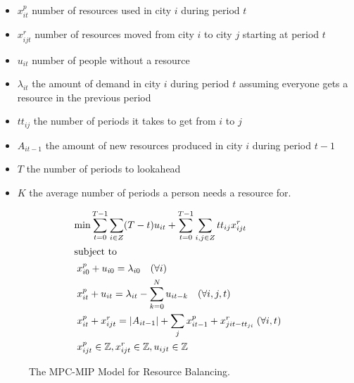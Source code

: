 \documentclass{article}
\begin{document}
\begin{itemize}
	\item $x^p_{it}$ number of resources used in city $i$ during period $t$
	\item $x^r_{ijt}$ number of resources moved from city $i$ to city $j$ starting at period $t$
	\item $u_{it}$ number of people without a resource
	\item $\lambda_{it}$ the amount of demand in city $i$ during period $t$ assuming everyone gets a resource in the previous period
	\item $tt_{ij}$ the number of periods it takes to get from $i$ to $j$
	\item $A_{it-1}$ the amount of new resources produced in city $i$ during period $t-1$
	\item $T$ the number of periods to lookahead
	\item $K$ the average number of periods a person needs a resource for.
\end{itemize}

\begin{figure}[!t]
\begin{subequations} \label{mpc}
\begin{flalign}
& \text{min} \sum_{t=0}^{T-1}\sum_{i \in Z} (T - t)u_{it}  + \sum_{t=0}^{T-1} \sum_{i,j \in Z} tt_{ij} x^r_{ijt} \label{mpc:obj} \\
\intertext{subject to} 
& \; x^p_{i0}  + u_{i0} = \lambda_{i0} \quad (\forall i) \label{mpc:constr:demand_balance_0} \\	
& \; x^p_{it}  + u_{it} = \lambda_{it} - \sum_{k=0}^N u_{it-k} \quad (\forall i,j,t) \label{mpc:constr:demand_balance} \\ 
& \; x^p_{it} + x^r_{ijt} = |A_{it-1}| + \sum_{j} x^p_{i t-1} + x^r_{jit - tt_{ji}} \; (\forall i,t)  \label{mpc:constr:balance} \\
& \; x^p_{ijt} \in \mathbb{Z}, x^r_{ijt} \in \mathbb{Z}, u_{ijt} \in \mathbb{Z}  \label{mpc:constr:domain}
\end{flalign}
\end{subequations}
\caption{The MPC-MIP Model for Resource Balancing.}
\label{fig:mpc}
\end{figure}
\end{document}
